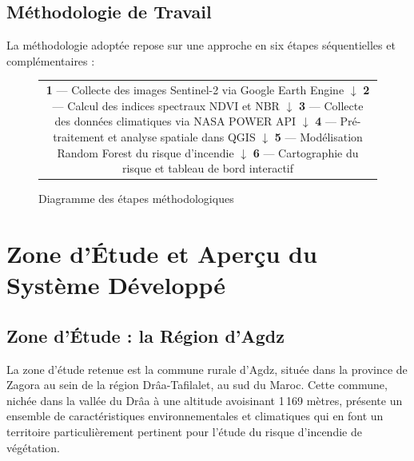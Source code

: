 \documentclass[12pt,a4paper]{report}
\begin{document}
\subsection{Méthodologie de Travail}

La méthodologie adoptée repose sur une approche en six étapes séquentielles et complémentaires :

\begin{figure}[H]
\centering
\begin{tabular}{c}
\fbox{\parbox{0.75\textwidth}{
\centering
\vspace{0.3cm}
\textbf{1} --- Collecte des images Sentinel-2 via Google Earth Engine \\[0.2cm]
$\downarrow$ \\[0.2cm]
\textbf{2} --- Calcul des indices spectraux NDVI et NBR \\[0.2cm]
$\downarrow$ \\[0.2cm]
\textbf{3} --- Collecte des données climatiques via NASA POWER API \\[0.2cm]
$\downarrow$ \\[0.2cm]
\textbf{4} --- Pré-traitement et analyse spatiale dans QGIS \\[0.2cm]
$\downarrow$ \\[0.2cm]
\textbf{5} --- Modélisation Random Forest du risque d'incendie \\[0.2cm]
$\downarrow$ \\[0.2cm]
\textbf{6} --- Cartographie du risque et tableau de bord interactif
\vspace{0.3cm}
}}
\end{tabular}
\caption{Diagramme des étapes méthodologiques}
\label{fig:workflow}
\end{figure}


\section{Zone d'Étude et Aperçu du Système Développé}

\subsection{Zone d'Étude : la Région d'Agdz}

La zone d'étude retenue est la commune rurale d'Agdz, située dans la province de Zagora au sein de la région Drâa-Tafilalet, au sud du Maroc. Cette commune, nichée dans la vallée du Drâa à une altitude avoisinant 1\,169 mètres, présente un ensemble de caractéristiques environnementales et climatiques qui en font un territoire particulièrement pertinent pour l'étude du risque d'incendie de végétation.
\end{document}
